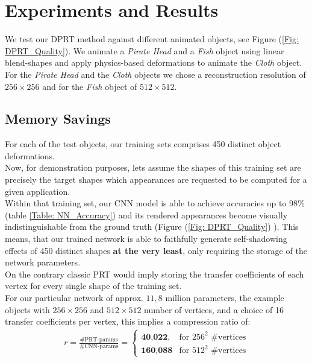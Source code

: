 \section{Experiments and Results}
We test our DPRT method against different animated objects,  see Figure (\ref{Fig: DPRT_Quality}). We animate a \textit{Pirate Head} and a \textit{Fish} object using linear blend-shapes and apply physics-based deformations to animate the \textit{Cloth} object.\\ 
For the \textit{Pirate Head} and the \textit{Cloth} objects we chose a reconstruction resolution of $256 \times 256$ and for the \textit{Fish } object of $512 \times 512$.
\subsection*{Memory Savings}
For each of the test objects, our training sets comprises 450 distinct object deformations. \\
Now, for demonstration purposes, lets assume the shapes of this training set are precisely the target shapes which appearances are requested to be computed for a given application.
\\
Within that training set, our CNN model is able to achieve accuracies up to 98\% (table \ref{Table: NN_Accuracy}) and its rendered appearances become visually indistinguishable from the ground truth (Figure (\ref{Fig: DPRT_Quality}) ). 
This means, that our trained network is able to faithfully generate self-shadowing effects of 450 distinct shapes \textbf{at the very least}, only requiring the storage of the network parameters.
\\ 
On the contrary classic PRT would imply storing the transfer coefficients of each vertex for every single shape of the training set.
\\ 
For our particular network of approx. $11,8$ million parameters,  the example objects with $256 \times 256$ and $512 \times 512$ number of vertices, and  a choice of 16 transfer coefficients per vertex, this implies a compression ratio of: 
\begin{align*}
r = \frac{\text{\# PRT-params}}{\text{\# CNN-params}}  = 
\begin{cases}
\textbf{40,022} , & \mbox{for } 256^2 \mbox{ \#vertices} \\
\textbf{160,088} & \mbox{for } 512^2 \mbox{ \#vertices}
\end{cases}
\end{align*}
